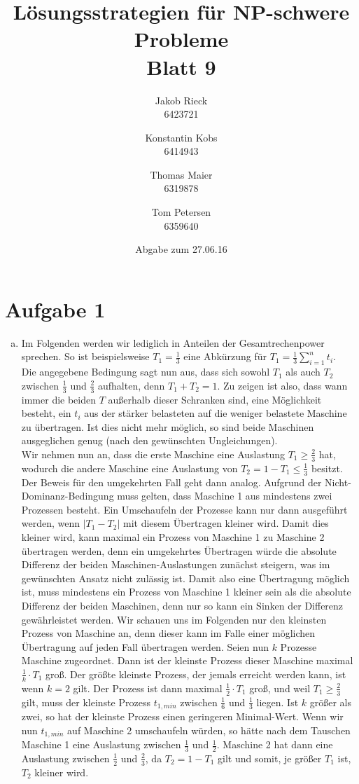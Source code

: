 \documentclass[12pt,a4paper]{article}
\title{Lösungsstrategien für NP-schwere Probleme\\Blatt 9}
\author{
		Jakob Rieck\\
		\small{6423721}
	\and
		Konstantin Kobs\\
		\small{6414943}
	\and
		Thomas Maier\\
		\small{6319878}
	\and
		Tom Petersen\\
		\small{6359640}
}
\date{Abgabe zum 27.06.16}
\begin{document}
\maketitle

\section*{Aufgabe 1}

\begin{enumerate}[a)]
	\item Im Folgenden werden wir lediglich in Anteilen der Gesamtrechenpower sprechen. So ist beispielsweise $T_1 = \frac{1}{3}$ eine Abkürzung für $T_1 = \frac{1}{3} \sum_{i=1}^{n} t_i$.\\
		Die angegebene Bedingung sagt nun aus, dass sich sowohl $T_1$ als auch $T_2$ zwischen $\frac{1}{3}$ und $\frac{2}{3}$ aufhalten, denn $T_1 + T_2 = 1$. Zu zeigen ist also, dass wann immer die beiden $T$ außerhalb dieser Schranken sind, eine Möglichkeit besteht, ein $t_i$ aus der stärker belasteten auf die weniger belastete Maschine zu übertragen. Ist dies nicht mehr möglich, so sind beide Maschinen ausgeglichen genug (nach den gewünschten Ungleichungen).\\
		Wir nehmen nun an, dass die erste Maschine eine Auslastung $T_1 \geq \frac{2}{3}$ hat, wodurch die andere Maschine eine Auslastung von $T_2 = 1 - T_1 \leq \frac{1}{3}$ besitzt. Der Beweis für den umgekehrten Fall geht dann analog. Aufgrund der Nicht-Dominanz-Bedingung muss gelten, dass Maschine 1 aus mindestens zwei Prozessen besteht. Ein Umschaufeln der Prozesse kann nur dann ausgeführt werden, wenn $|T_1 - T_2|$ mit diesem Übertragen kleiner wird. Damit dies kleiner wird, kann maximal ein Prozess von Maschine 1 zu Maschine 2 übertragen werden, denn ein umgekehrtes Übertragen würde die absolute Differenz der beiden Maschinen-Auslastungen zunächst steigern, was im gewünschten Ansatz nicht zulässig ist. Damit also eine Übertragung möglich ist, muss mindestens ein Prozess von Maschine 1 kleiner sein als die absolute Differenz der beiden Maschinen, denn nur so kann ein Sinken der Differenz gewährleistet werden. Wir schauen uns im Folgenden nur den kleinsten Prozess von Maschine an, denn dieser kann im Falle einer möglichen Übertragung auf jeden Fall übertragen werden. Seien nun $k$ Prozesse Maschine zugeordnet. Dann ist der kleinste Prozess dieser Maschine maximal $\frac{1}{k} \cdot T_1$ groß. Der größte kleinste Prozess, der jemals erreicht werden kann, ist wenn $k=2$ gilt. Der Prozess ist dann maximal $\frac{1}{2} \cdot T_1$ groß, und weil $T_1 \geq \frac{2}{3}$ gilt, muss der kleinste Prozess $t_{1,min}$ zwischen $\frac{1}{6}$ und $\frac{1}{3}$ liegen. Ist $k$ größer als zwei, so hat der kleinste Prozess einen geringeren Minimal-Wert. Wenn wir nun $t_{1,min}$ auf Maschine 2 umschaufeln würden, so hätte nach dem Tauschen Maschine 1 eine Auslastung zwischen $\frac{1}{3}$ und $\frac{1}{2}$. Maschine 2 hat dann eine Auslastung zwischen $\frac{1}{2}$ und $\frac{2}{3}$, da $T_2 = 1 - T_1$ gilt und somit, je größer $T_1$ ist, $T_2$ kleiner wird.\\

\end{enumerate}
\end{document}
